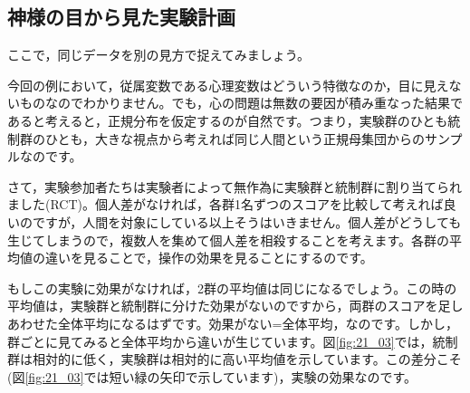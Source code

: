 \documentclass{ltjbook}
\begin{document}


\subsection{神様の目から見た実験計画}
ここで，同じデータを別の見方で捉えてみましょう。

今回の例において，従属変数である心理変数はどういう特徴なのか，目に見えないものなのでわかりません。でも，心の問題は無数の要因が積み重なった結果であると考えると，正規分布を仮定するのが自然です。つまり，実験群のひとも統制群のひとも，大きな視点から考えれば同じ人間という正規母集団からのサンプルなのです。

さて，実験参加者たちは実験者によって無作為に実験群と統制群に割り当てられました(RCT)。個人差がなければ，各群1名ずつのスコアを比較して考えれば良いのですが，人間を対象にしている以上そうはいきません。個人差がどうしても生じてしまうので，複数人を集めて個人差を相殺することを考えます。各群の平均値の違いを見ることで，操作の効果を見ることにするのです。

もしこの実験に効果がなければ，2群の平均値は同じになるでしょう。この時の平均値は，実験群と統制群に分けた効果がないのですから，両群のスコアを足しあわせた全体平均になるはずです。効果がない=全体平均，なのです。しかし，群ごとに見てみると全体平均から違いが生じています。図\ref{fig:21_03}では，統制群は相対的に低く，実験群は相対的に高い平均値を示しています。この差分こそ(図\ref{fig:21_03}では短い緑の矢印で示しています)，実験の効果なのです。
\end{document}
